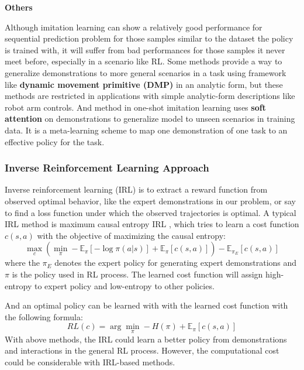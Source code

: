 \documentclass{article}
\begin{document}
\textbf{Others}

Although imitation learning can show a relatively good performance for sequential prediction problem for those samples similar to the dataset the policy is trained with, it will suffer from bad performances for those samples it never meet before, especially in a scenario like RL. Some methods provide a way to generalize demonstrations to more general scenarios in a task using framework like \textbf{dynamic movement primitive (DMP)} \cite{pastor2009learning} in an analytic form, but these methods are restricted in applications with simple analytic-form descriptions like robot arm controls. And method in one-shot imitation learning \cite{duan2017one} uses \textbf{soft attention} on demonstrations to generalize model to unseen scenarios in training data. It is a meta-learning scheme to map one demonstration of one task to an effective policy for the task. 

\subsubsection{Inverse Reinforcement Learning Approach}
Inverse reinforcement learning (IRL) \cite{ng2000algorithms} \cite{russell1998learning} is to extract a reward function from observed optimal behavior, like the expert demonstrations in our problem, or say to find a loss function under which the observed trajectories is optimal. A typical IRL method is maximum causal entropy IRL \cite{ziebart2008maximum}, which tries to learn a cost function $c(s,a)$ with the objective of maximizing the causal entropy:
\begin{equation}
    \max_c(\min_\pi -\mathbb{E}_\pi[-\log \pi(a|s)]+\mathbb{E}_\pi[c(s,a)])-\mathbb{E}_{\pi_E}[c(s,a)]
\end{equation}
where the $\pi_E$ denotes the expert policy for generating expert demonstrations and $\pi$ is the policy used in RL process. The learned cost function will assign high-entropy to expert policy and low-entropy to other policies.

And an optimal policy can be learned with with the learned cost function with the following formula:
\begin{equation}
    RL(c)=\arg \min_{\pi} -H(\pi)+\mathbb{E}_{\pi}[c(s,a)]
\end{equation}
With above methods, the IRL could learn a better policy from demonstrations and interactions in the general RL process. However, the computational cost could be considerable with IRL-based methods.
\end{document}
